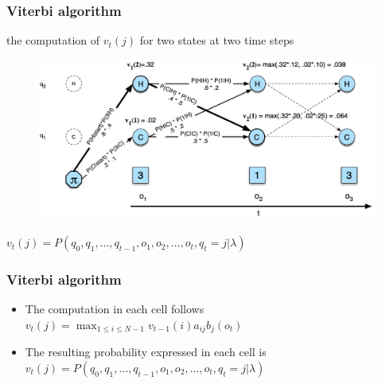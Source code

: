 \documentclass{beamer}
\begin{document}
\begin{frame}
\frametitle{Viterbi algorithm}
the computation of $v_t(j)$ for two states at two time steps
\begin{figure}[H]
\centering
\includegraphics[width=\textwidth]{img/2.png}
\end{figure}
$
            v_{t}(j)=P\left(q_{0}, q_{1}, \ldots, q_{t-1}, o_{1}, o_{2}, \ldots, o_{t}, q_{t}=j | \lambda\right)
            $
\end{frame}

\begin{frame}
    \frametitle{Viterbi algorithm}
    \begin{itemize}
        \item The computation in each cell follows $
        v_{t}(j)=\max _{1 \leq i \leq N-1} v_{t-1}(i) a_{i j} b_{j}\left(o_{t}\right)
        $
        \item The resulting probability expressed in each cell is $
        v_{t}(j)=P\left(q_{0}, q_{1}, \ldots, q_{t-1}, o_{1}, o_{2}, \ldots, o_{t}, q_{t}=j | \lambda\right)
        $
    \end{itemize}
    
\end{frame}
    
\end{document}
